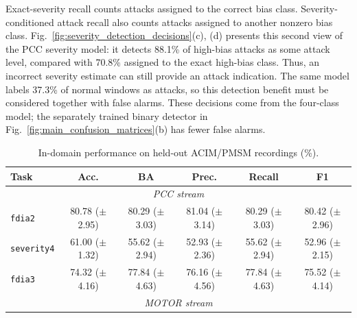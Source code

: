 \documentclass[letterpaper,journal]{IEEEtran}
\begin{document}
Exact-severity recall counts attacks assigned to the correct bias class. Severity-conditioned attack recall also counts attacks assigned to another nonzero bias class. Fig.~\ref{fig:severity_detection_decisions}(c), (d) presents this second view of the PCC severity model: it detects 88.1\% of high-bias attacks as some attack level, compared with 70.8\% assigned to the exact high-bias class. Thus, an incorrect severity estimate can still provide an attack indication. The same model labels 37.3\% of normal windows as attacks, so this detection benefit must be considered together with false alarms. These decisions come from the four-class model; the separately trained binary detector in Fig.~\ref{fig:main_confusion_matrices}(b) has fewer false alarms.

\begin{table}[t]
\centering
\footnotesize
\caption{In-domain performance on held-out ACIM/PMSM recordings (\%).}
\label{tab:all_tasks_in_domain}
\renewcommand{\arraystretch}{1.15}
\setlength{\tabcolsep}{1.7pt}
\begin{tabular}{@{}lccccc@{}}
\hline
Task & Acc. & BA & Prec. & Recall & F1 \\\hline
\hline\multicolumn{6}{c}{\textit{PCC stream}} \\\hline
\texttt{fdia2} & \shortstack{80.78\\($\pm$2.95)} & \shortstack{80.29\\($\pm$3.03)} & \shortstack{81.04\\($\pm$3.14)} & \shortstack{80.29\\($\pm$3.03)} & \shortstack{80.42\\($\pm$2.96)} \\
\texttt{severity4} & \shortstack{61.00\\($\pm$1.32)} & \shortstack{55.62\\($\pm$2.94)} & \shortstack{52.93\\($\pm$2.36)} & \shortstack{55.62\\($\pm$2.94)} & \shortstack{52.96\\($\pm$2.15)} \\
\texttt{fdia3} & \shortstack{74.32\\($\pm$4.16)} & \shortstack{77.84\\($\pm$4.63)} & \shortstack{76.16\\($\pm$4.56)} & \shortstack{77.84\\($\pm$4.63)} & \shortstack{75.52\\($\pm$4.14)} \\
\hline\multicolumn{6}{c}{\textit{MOTOR stream}} \\\hline

\end{tabular}
\end{table}
\end{document}
